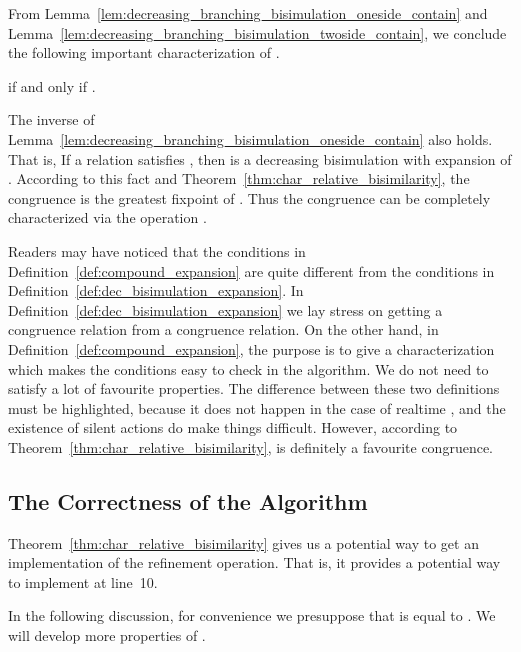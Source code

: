 \documentclass{llncs}
\begin{document}
From Lemma~\ref{lem:decreasing_branching_bisimulation_oneside_contain} and  Lemma~\ref{lem:decreasing_branching_bisimulation_twoside_contain}, we conclude the following important characterization of .

\begin{theorem}\label{thm:char_relative_bisimilarity}
 if and only if  .
\end{theorem}



\begin{remark}
The inverse of Lemma~\ref{lem:decreasing_branching_bisimulation_oneside_contain} also holds. That is,
If a relation  satisfies , then  is a decreasing bisimulation with expansion of .    According to this fact and Theorem~\ref{thm:char_relative_bisimilarity}, the congruence  is the greatest fixpoint of
. Thus the congruence  can be completely characterized via the operation .


Readers may have noticed that the conditions in Definition~\ref{def:compound_expansion} are quite different from the conditions in Definition~\ref{def:dec_bisimulation_expansion}. In Definition~\ref{def:dec_bisimulation_expansion}
we lay stress on  getting a congruence relation from a congruence relation.    On the other hand,  in Definition~\ref{def:compound_expansion},  the purpose is to give a characterization which makes the conditions easy to check in the algorithm. We do not need  to satisfy a lot of  favourite properties. The difference between these two definitions must be highlighted, because it does not happen in the case of realtime , and the existence of silent actions do make things difficult. However, according to Theorem~\ref{thm:char_relative_bisimilarity},  is definitely a favourite congruence.
\end{remark}

\subsection{The Correctness of the Algorithm }\label{subsec:Expansion_correctness}





Theorem~\ref{thm:char_relative_bisimilarity} gives us a potential way to get an implementation of the refinement operation.   That is, it provides a potential way to implement  at line~10.


In the following discussion, for convenience we presuppose that  is equal to .  We will develop more properties of .
\end{document}

